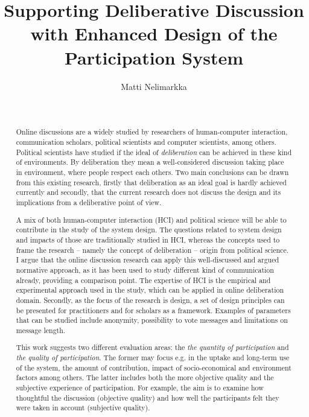 \documentclass{article}
\date{~}
\author{\textsf{Matti Nelimarkka}}
\title{\textsf{Supporting Deliberative Discussion with Enhanced Design of the Participation System}}
\begin{document}
\maketitle

\begin{abstract}

Online discussions are a widely studied by researchers of human-computer interaction, communication scholars, political scientists and computer scientists, among others. Political scientists have studied if the ideal of \textit{deliberation} can be achieved in these kind of environments. By deliberation they mean a well-considered discussion taking place in environment, where people respect each others. Two main conclusions can be drawn from this existing research, firstly that deliberation as an ideal goal is hardly achieved currently and secondly, that the current research does not discuss the design and its implications from a deliberative point of view.

A mix of both human-computer interaction (HCI) and political science will be able to contribute in the study of the system design. The questions related to system design and impacts of those are traditionally studied in HCI, whereas the concepts used to frame the research -- namely the concept of deliberation -- origin from political science. I argue that the online discussion research can apply this well-discussed and argued normative approach, as it has been used to study different kind of communication already, providing a comparison point. The expertise of HCI is the empirical and experimental approach used in the study, which can be applied in online deliberation domain. Secondly, as the focus of the research is design, a set of design principles can be presented for practitioners and for scholars as a framework. Examples of parameters that can be studied include anonymity, possibility to vote messages and limitations on message length.

This work suggests two different evaluation areas: the \textit{the quantity of participation} and \textit{the quality of participation}. The former may focus e.g. in the uptake and long-term use of the system, the amount of contribution, impact of socio-economical and environment factors among others. The latter includes both the more objective quality and the subjective experience of participation. For example, the aim is to examine how thoughtful the discussion (objective quality) and how well the participants felt they were taken in account (subjective quality).
\end{abstract}
\end{document}
